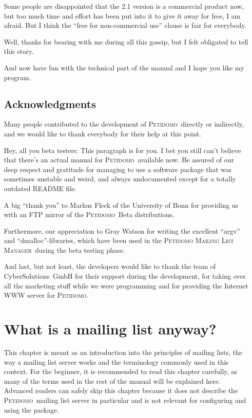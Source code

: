 \documentclass[a4paper,10pt]{scrreprt}
\newcommand{\PetidomoM}{{\scshape Peti\-domo Mail\-ing List Ma\-nager}}
\newcommand{\Petidomo}{{\scshape Peti\-domo}}
\begin{document}
Some people are disappointed that the 2.1 version is a commercial
product now, but too much time and effort has been put into it to give
it away for free, I am afraid. But I think the ``free for
non-commercial use'' clause is fair for everybody.

Well, thanks for bearing with me during all this gossip, but I felt
obligated to tell this story.

And now have fun with the technical part of the manual and I hope you
like my program.

\section{Acknowledgments}

Many people contributed to the development of \Petidomo\ directly or
indirectly, and we would like to thank everybody for their help at
this point.

Hey, all you beta testers: This paragraph is for you. I bet you still
can't believe that there's an actual manual for \Petidomo\ available
now. Be assured of our deep respect and gratitude for managing to use
a software package that was sometimes unstable and weird, and always
undocumented except for a totally outdated README file.

A big ``thank you'' to Markus Fleck of the University of Bonn for
providing us with an FTP mirror of the \Petidomo\ Beta distributions.

\begin{sloppypar}
Furthermore, our appreciation to Gray Watson for writing the excellent
``argv'' and ``dmalloc''-libraries, which have been used in the
\PetidomoM\ during the beta testing phase.
\end{sloppypar}

And last, but not least, the developers would like to thank the team
of CyberSolutions~GmbH for their support during the development,
for taking over all the marketing stuff while we were programming and
for providing the Internet WWW server for \Petidomo.

\chapter{What is a mailing list anyway?}

This chapter is meant as an introduction into the principles of
mailing lists, the way a mailing list server works and the terminology
commonly used in this context. For the beginner, it is recommended to
read this chapter carefully, as many of the terms used in the rest of
the manual will be explained here. Advanced readers can safely skip
this chapter because it does not describe the \Petidomo\ mailing list
server in particular and is not relevant for configuring and using the
package.
\end{document}
